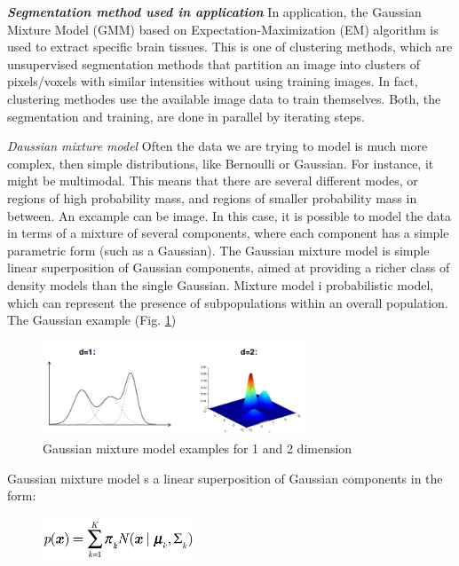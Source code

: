 \textbf{\textit{Segmentation method used in application}}
In application, the Gaussian Mixture Model (GMM) based on Expectation-Maximization (EM) algorithm  is used to extract specific brain tissues. This is one of clustering methods, which are unsupervised segmentation methods that partition an image into clusters of pixels/voxels with similar intensities without using training images. In fact, clustering methodes use the available image data to train themselves. Both, the segmentation and training, are done in parallel by iterating steps. 

\textit{Daussian mixture model}
Often the data we are trying to model is much more complex, then simple distributions, like Bernoulli or Gaussian.  For instance, it might be multimodal.  This means  that  there  are  several  different modes,  or  regions  of  high  probability  mass,  and regions of smaller probability mass in between. An excample can be image. In this case, it is possible to model the data in terms of a mixture of several components, where each component has a simple parametric form (such as a Gaussian).
The Gaussian mixture model is simple linear superposition of Gaussian components, aimed at providing a richer class of density models than the single Gaussian. Mixture model i probabilistic model, which can represent the presence of subpopulations within an overall population. 
The Gaussian example (Fig. \ref{fig:figures/m09_4}) 

\begin{figure}[H]
\centering{}\includegraphics[width=0.7\textwidth]{figures/Module_09/m09_4}\caption{Gaussian mixture model examples for 1 and 2 dimension  \label{fig:figures/m09_4}}
\end{figure}

Gaussian mixture model s a linear superposition of Gaussian
components in the form:

\begin{figure}[H]
\centering{}\includegraphics[width=0.4\textwidth]{figures/Module_09/m09_27}
\end{figure}

